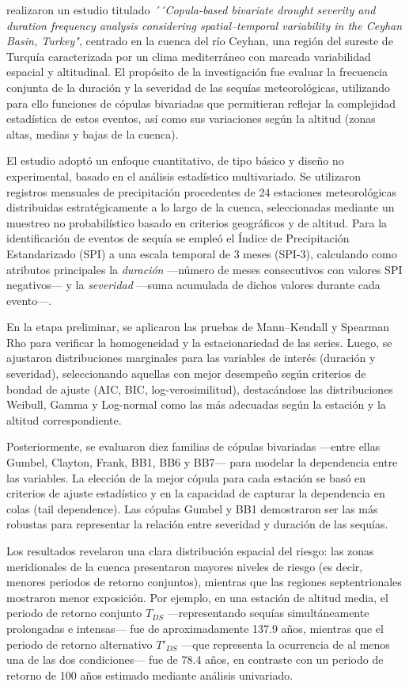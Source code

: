 \textcite{Esit2023} realizaron un estudio titulado \textit{´´Copula-based bivariate drought severity and duration frequency analysis considering spatial–temporal variability in the Ceyhan Basin, Turkey"}, centrado en la cuenca del río Ceyhan, una región del sureste de Turquía caracterizada por un clima mediterráneo con marcada variabilidad espacial y altitudinal. El propósito de la investigación fue evaluar la frecuencia conjunta de la duración y la severidad de las sequías meteorológicas, utilizando para ello funciones de cópulas bivariadas que permitieran reflejar la complejidad estadística de estos eventos, así como sus variaciones según la altitud (zonas altas, medias y bajas de la cuenca).

El estudio adoptó un enfoque cuantitativo, de tipo básico y diseño no experimental, basado en el análisis estadístico multivariado. Se utilizaron registros mensuales de precipitación procedentes de 24 estaciones meteorológicas distribuidas estratégicamente a lo largo de la cuenca, seleccionadas mediante un muestreo no probabilístico basado en criterios geográficos y de altitud. Para la identificación de eventos de sequía se empleó el Índice de Precipitación Estandarizado (SPI) a una escala temporal de 3 meses (SPI-3), calculando como atributos principales la \textit{duración} —número de meses consecutivos con valores SPI negativos— y la \textit{severidad} —suma acumulada de dichos valores durante cada evento—.

En la etapa preliminar, se aplicaron las pruebas de Mann–Kendall y Spearman Rho para verificar la homogeneidad y la estacionariedad de las series. Luego, se ajustaron distribuciones marginales para las variables de interés (duración y severidad), seleccionando aquellas con mejor desempeño según criterios de bondad de ajuste (AIC, BIC, log-verosimilitud), destacándose las distribuciones Weibull, Gamma y Log-normal como las más adecuadas según la estación y la altitud correspondiente.

Posteriormente, se evaluaron diez familias de cópulas bivariadas —entre ellas Gumbel, Clayton, Frank, BB1, BB6 y BB7— para modelar la dependencia entre las variables. La elección de la mejor cópula para cada estación se basó en criterios de ajuste estadístico y en la capacidad de capturar la dependencia en colas (tail dependence). Las cópulas Gumbel y BB1 demostraron ser las más robustas para representar la relación entre severidad y duración de las sequías.

Los resultados revelaron una clara distribución espacial del riesgo: las zonas meridionales de la cuenca presentaron mayores niveles de riesgo (es decir, menores periodos de retorno conjuntos), mientras que las regiones septentrionales mostraron menor exposición. Por ejemplo, en una estación de altitud media, el periodo de retorno conjunto \( T_{DS} \) —representando sequías simultáneamente prolongadas e intensas— fue de aproximadamente 137.9 años, mientras que el periodo de retorno alternativo \( T'_{DS} \) —que representa la ocurrencia de al menos una de las dos condiciones— fue de 78.4 años, en contraste con un periodo de retorno de 100 años estimado mediante análisis univariado.

